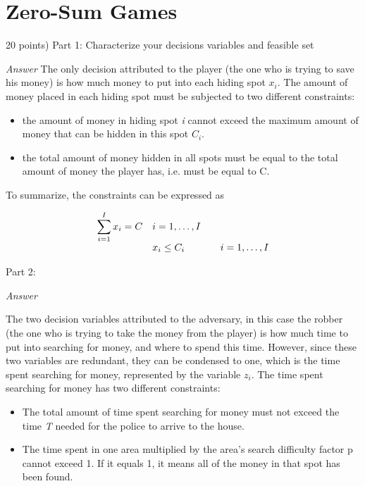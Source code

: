 \documentclass[10pt]{article}
\newenvironment{exercise}[2][Exercise]{\begin{trivlist}
  \item[\hskip \labelsep {\bfseries #1}\hskip \labelsep {\bfseries #2.}]}{\end{trivlist}}
\begin{document}
 \section{Zero-Sum Games}
\begin{exercise}{5}
(20 points)
Part 1: Characterize your decisions variables and feasible set

\textit{Answer}
The only decision attributed to the player (the one who is trying to save his money) is how much money to put into each hiding spot $x_i$. The amount of money placed in each hiding spot must be subjected to two different constraints:

\begin{itemize}
    \item the amount of money in hiding spot \textit{i} cannot exceed the maximum amount of money that can be hidden in this spot $C_i$.
    \item the total amount of money hidden in all spots must be equal to the total amount of money the player has, i.e. must be equal to C.
\end{itemize}

To summarize, the constraints can be expressed as

\begin{equation}
\begin{array}{ll@{}lll}

\displaystyle\sum\limits_{i=1}^{I} x_i = C && i=1 ,\dots, I \\
&& x_i \leq C_i && i=1 ,\dots, I\\

\end{array}
\end{equation}




Part 2:

\textit{Answer}

The two decision variables attributed to the adversary, in this case the robber (the one who is trying to take the money from the player) is how much time to put into searching for money, and where to spend this time. However, since these two variables are redundant, they can be condensed to one, which is the time spent searching for money, represented by the variable $z_i$. The time spent searching for money has two different constraints:

\begin{itemize}
    \item The total amount of time spent searching for money must not exceed the time \textit{T} needed for the police to arrive to the house.
    \item The time spent in one area multiplied by the area's search difficulty factor p cannot exceed 1. If it equals 1, it means all of the money in that spot has been found.
\end{itemize}


\end{exercise}
\end{document}

